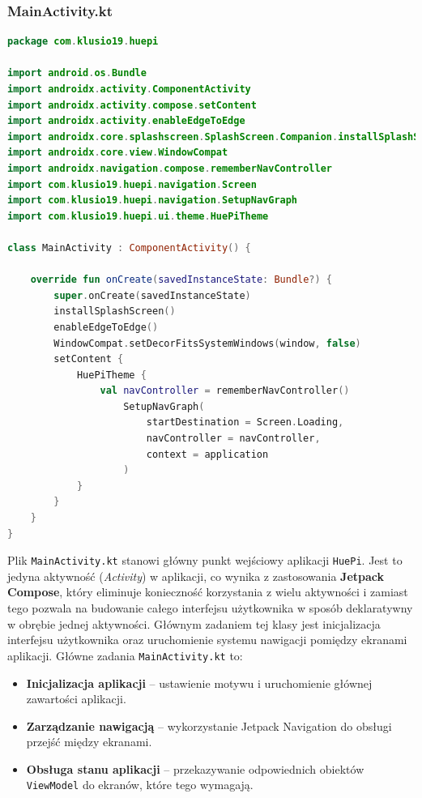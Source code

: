 \documentclass[12pt]{article}
\begin{document}
\subsubsection{MainActivity.kt}
\begin{lstlisting}[language=Kotlin]
package com.klusio19.huepi

import android.os.Bundle
import androidx.activity.ComponentActivity
import androidx.activity.compose.setContent
import androidx.activity.enableEdgeToEdge
import androidx.core.splashscreen.SplashScreen.Companion.installSplashScreen
import androidx.core.view.WindowCompat
import androidx.navigation.compose.rememberNavController
import com.klusio19.huepi.navigation.Screen
import com.klusio19.huepi.navigation.SetupNavGraph
import com.klusio19.huepi.ui.theme.HuePiTheme

class MainActivity : ComponentActivity() {

    override fun onCreate(savedInstanceState: Bundle?) {
        super.onCreate(savedInstanceState)
        installSplashScreen()
        enableEdgeToEdge()
        WindowCompat.setDecorFitsSystemWindows(window, false)
        setContent {
            HuePiTheme {
                val navController = rememberNavController()
                    SetupNavGraph(
                        startDestination = Screen.Loading,
                        navController = navController,
                        context = application
                    )
            }
        }
    }
}
\end{lstlisting}
Plik \texttt{MainActivity.kt} stanowi główny punkt wejściowy aplikacji \texttt{HuePi}. Jest to jedyna aktywność (\textit{Activity}) w aplikacji, co wynika z zastosowania
\textbf{Jetpack Compose}, który eliminuje konieczność korzystania z wielu aktywności i zamiast tego pozwala na budowanie całego interfejsu użytkownika w sposób deklaratywny
w obrębie jednej aktywności. Głównym zadaniem tej klasy jest inicjalizacja interfejsu użytkownika oraz uruchomienie systemu nawigacji pomiędzy ekranami aplikacji.
Główne zadania \texttt{MainActivity.kt} to:
\begin{itemize}
    \item \textbf{Inicjalizacja aplikacji} – ustawienie motywu i uruchomienie głównej zawartości aplikacji.
    \item \textbf{Zarządzanie nawigacją} – wykorzystanie Jetpack Navigation do obsługi przejść między ekranami.
    \item \textbf{Obsługa stanu aplikacji} – przekazywanie odpowiednich obiektów \texttt{ViewModel} do ekranów, które tego wymagają.
\end{itemize}
\end{document}
